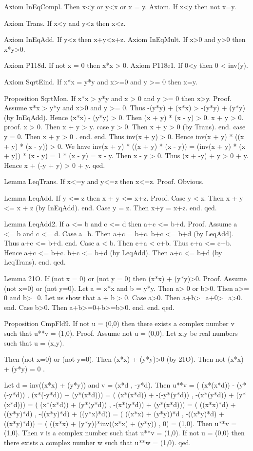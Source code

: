 \documentclass{article}
\newenvironment{forthel}{\begin{leftbar}}{\end{leftbar}}
\begin{document}
\begin{forthel}
Axiom InEqCompl. Then x<y or y<x or x = y.
Axiom. If x<y then not x=y.

Axiom Trans. If x<y and y<z then x<z.


Axiom InEqAdd. If y<z then x+y<x+z.
Axiom InEqMult. If x>0 and y>0 then x*y>0.


Axiom P118d. If not x = 0 then x*x > 0.
Axiom P118e1. If 0<y then 0 < inv(y).

Axiom SqrtEind. If x*x = y*y and x>=0 and y >= 0 then x=y.

Proposition SqrtMon. If x*x > y*y and x > 0  and y >= 0 then x>y.
Proof.	Assume x*x > y*y and x>0 and y >= 0.
Thus  -(y*y) + (x*x) > -(y*y) + (y*y) (by InEqAdd). 
Hence (x*x) - (y*y) > 0.
Then  (x + y) * (x - y) > 0.
x + y > 0.
proof. 	x > 0. Then x + y > y.
case y > 0. Then x + y > 0 (by Trans). end.
case y = 0. Then x + y  > 0 . end.
end.
Thus inv(x + y) > 0. Hence inv(x + y) * ((x + y) * (x - y)) > 0.
We have inv(x + y) * ((x + y) * (x - y)) 
= (inv(x + y) * (x + y)) * (x - y)
= 1 * (x - y) = x - y.
Then x - y > 0.
Thus (x + -y) + y > 0 + y.
Hence x + (-y + y) > 0 + y.
qed.

Lemma LeqTrans. If x<=y and y<=z then x<=z.
Proof. 	Obvious.


Lemma LeqAdd. 	If y <= z then x + y <= x+z.
Proof.			Case y < z. Then x + y <= x + z (by InEqAdd). end.
Case y = z. Then x+y = x+z. end.
qed.

Lemma LeqAdd2.  If a <= b and c <= d then a+c <= b+d.
Proof.			Assume a <= b and c <= d. 
Case a=b. Then a+c = b+c. b+c <= b+d (by LeqAdd). Thus a+c <= b+d. end.
Case a < b. Then c+a < c+b. Thus c+a <= c+b. Hence a+c <= b+c. b+c <= b+d (by LeqAdd).
Then a+c <= b+d (by LeqTrans). end.
qed.


Lemma 21O. If (not x = 0) or (not y = 0) then (x*x) + (y*y)>0.
Proof. 
Assume (not x=0) or (not y=0).
Let a = x*x and b = y*y.
Then a> 0 or b>0.
Then a>= 0 and b>=0.
Let us show that a + b > 0.
Case a>0. Then a+b>=a+0>=a>0. end.
Case b>0. Then a+b>=0+b>=b>0. end.
end.
qed.

Proposition CmpFld9. If not u = (0,0) then there exists a complex number v such that u**v = (1,0).
Proof. Assume not u = (0,0).
Let x,y be real numbers such that u = (x,y).

Then (not x=0) or (not y=0).
Then (x*x) + (y*y)>0 (by 21O).
Then not (x*x) + (y*y) = 0 .

Let d = inv((x*x) + (y*y)) and 
v = (x*d , -y*d). 
Then u**v = ( (x*(x*d)) - (y*(-y*d)) , (x*(-y*d)) + (y*(x*d)))
= ( (x*(x*d)) + -(-y*(y*d)) , -(x*(y*d)) + (y*(x*d)))
= ( (x*(x*d)) + (y*(y*d)) , -(x*(y*d)) + (y*(x*d)))
= ( ((x*x)*d) + ((y*y)*d) , -((x*y)*d) + ((y*x)*d))
= ( ((x*x) + (y*y))*d , -((x*y)*d) + ((x*y)*d))
= ( ((x*x) + (y*y))*inv((x*x) + (y*y)) , 0)
= (1,0).
Then u**v = (1,0).
Then v is a complex number such that u**v = (1,0).
If not u = (0,0) then there exists a complex number w such that u**w = (1,0).
qed.





\end{forthel}
\end{document}
